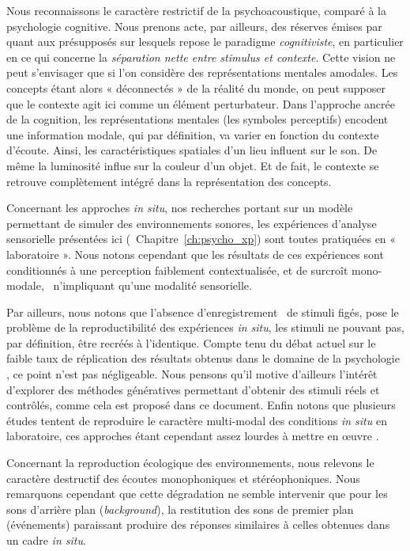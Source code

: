 Nous reconnaissons le caractère restrictif de la psychoacoustique, comparé à la psychologie cognitive. Nous prenons acte, par ailleurs, des réserves émises par \cite{maffiolo_caracterisation_1999} quant aux présupposés sur lesquels repose le paradigme \emph{cognitiviste}, en particulier en ce qui concerne la \emph{séparation nette entre stimulus et contexte}. Cette vision ne peut s'envisager que si l'on considère des représentations mentales amodales. Les concepts étant alors « déconnectés » de la réalité du monde, on peut supposer que le contexte agit ici comme un élément perturbateur. Dans l'approche ancrée de la cognition, les représentations mentales (les symboles perceptifs) encodent une information modale, qui par définition, va varier en fonction du contexte d'écoute. Ainsi, les caractéristiques spatiales d'un lieu influent sur le son. De même la luminosité influe sur la couleur d'un objet. Et de fait, le contexte se retrouve complètement intégré dans la représentation des concepts.

Concernant les approches \emph{in situ}, nos recherches portant sur un modèle permettant de simuler des environnements sonores, les expériences d'analyse sensorielle présentées ici (\cf~Chapitre~\ref{ch:psycho_xp}) sont toutes pratiquées en « laboratoire ». Nous notons cependant que les résultats de ces expériences sont conditionnés à une perception faiblement contextualisée, et de surcroît mono-modale, \ie~n'impliquant qu'une modalité sensorielle.

Par ailleurs, nous notons que l'absence d'enregistrement \ie~de stimuli figés, pose le problème de la reproductibilité des expériences \emph{in situ}, les stimuli ne pouvant pas, par définition, être recréés à l'identique. Compte tenu du débat actuel sur le faible taux de réplication des résultats obtenus dans le domaine de la psychologie \citep{spellman2015short}, ce point n'est pas négligeable. Nous pensons qu'il motive d'ailleurs l'intérêt d'explorer des méthodes génératives permettant d'obtenir des stimuli réels et contrôlés, comme cela est proposé dans ce document. Enfin notons que plusieurs études tentent de reproduire le caractère multi-modal des conditions \emph{in situ} en laboratoire, ces approches étant cependant assez lourdes à mettre en œuvre \citep{woloszyn1997vers,morel2016noise}.

Concernant la reproduction écologique des environnements, nous relevons le caractère destructif des écoutes monophoniques et stéréophoniques. Nous remarquons cependant que cette dégradation ne semble intervenir que pour les sons d'arrière plan (\emph{background}), la restitution des sons de premier plan (événements) paraissant produire des réponses similaires à celles obtenues dans un cadre \emph{in situ}.

